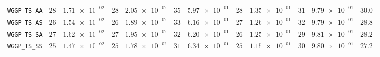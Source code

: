 \begin{xltabular}{\textwidth}{l||cC|cC|cC|cC|cC||c}
	\texttt{WGGP\_TS\_AA} & $ 28$ & $ \num{1.71e-02}$ & $ 28$ & $ \num{2.05e-02}$ & $ 35$ & $ \num{5.97e-01}$ & $ 28$ & $ \num{1.35e-01}$ & $ 31$ & $ \num{9.79e-01}$ & $ 30.0$  \\
	\texttt{WGGP\_TS\_AS} & $ 26$ & $ \num{1.54e-02}$ & $ 26$ & $ \num{1.89e-02}$ & $ 33$ & $ \num{6.16e-01}$ & $ 27$ & $ \num{1.26e-01}$ & $ 32$ & $ \num{9.79e-01}$ & $ 28.8$  \\
	\texttt{WGGP\_TS\_SA} & $ 27$ & $ \num{1.62e-02}$ & $ 27$ & $ \num{1.95e-02}$ & $ 32$ & $ \num{6.20e-01}$ & $ 26$ & $ \num{1.25e-01}$ & $ 29$ & $ \num{9.81e-01}$ & $ 28.2$  \\
	\texttt{WGGP\_TS\_SS} & $ 25$ & $ \num{1.47e-02}$ & $ 25$ & $ \num{1.78e-02}$ & $ 31$ & $ \num{6.34e-01}$ & $ 25$ & $ \num{1.15e-01}$ & $ 30$ & $ \num{9.80e-01}$ & $ 27.2$  \\
\end{xltabular}
